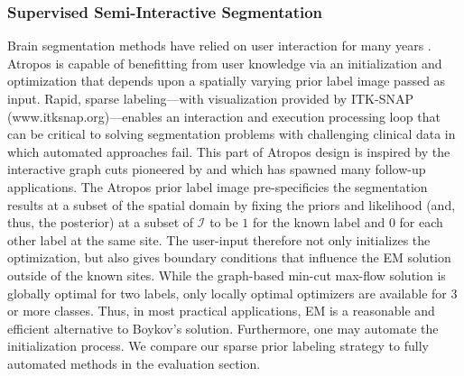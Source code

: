 \documentclass[11pt,english]{article}
\begin{document}
\subsubsection{Supervised Semi-Interactive Segmentation}
Brain segmentation methods have relied on user interaction for many
years \citep{Lim1989,Julin1997,Freeborough1997a,Yushkevich2006}.
Atropos is capable of benefitting from user knowledge via an
initialization and optimization that depends upon a spatially
varying prior label image passed as input.  Rapid, sparse
labeling---with visualization provided by ITK-SNAP
(www.itksnap.org)---enables an interaction and execution processing
loop that can be critical to solving segmentation problems with
challenging clinical data in which automated approaches fail.  This
part of Atropos design is inspired by the interactive graph cuts
pioneered by \cite{Boykov2001} and which has spawned many follow-up
applications.  The Atropos prior label
image pre-specificies the segmentation results at a subset of the
spatial domain by fixing the priors and likelihood (and, thus, the
posterior) at a subset of $\mathcal{I}$ to be $1$ for the known label
and $0$ for each other label at the same site.  The user-input
therefore not only initializes the optimization, but also gives boundary conditions
that influence the EM solution outside of the known sites.  While the
graph-based min-cut max-flow solution is globally optimal for two
labels, only locally optimal optimizers are available for 3 or more
classes.  Thus, in most practical applications, EM is a
reasonable and efficient alternative to Boykov's solution.
Furthermore, one may automate the initialization process.  We compare
our sparse prior labeling strategy to fully automated methods in the
evaluation section.
\end{document}
